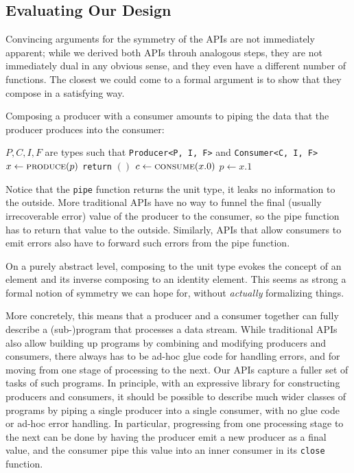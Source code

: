\documentclass[sigplan,screen,10pt,anonymous,review]{acmart}
\begin{document}
\subsection{Evaluating Our Design}\label{evaluating_ours}

Convincing arguments for the symmetry of the APIs are not immediately apparent; while we derived both APIs throuh analogous steps, they are not immediately dual in any obvious sense, and they even have a different number of functions. The closest we could come to a formal argument is to show that they compose in a satisfying way.

Composing a producer with a consumer amounts to piping the data that the producer produces into the consumer:

\begin{algorithmic}
\Require $P, C, I, F$ are types such that \texttt{Producer<P, I, F>} and \texttt{Consumer<C, I, F>}
    \Loop
        \State $x \gets \Call{produce}{p}$
            \State {}
            \State \texttt{return} $()$
        \Else
            \State $c \gets \Call{consume}{x.0}$
            \State $p \gets x.1$
        \EndIf
    \EndLoop
\EndProcedure
\end{algorithmic}

Notice that the \texttt{pipe} function returns the unit type, it leaks no information to the outside. More traditional APIs have no way to funnel the final (usually irrecoverable error) value of the producer to the consumer, so the pipe function has to return that value to the outside. Similarly, APIs that allow consumers to emit errors also have to forward such errors from the pipe function.

On a purely abstract level, composing to the unit type evokes the concept of an element and its inverse composing to an identity element. This seems as strong a formal notion of symmetry we can hope for, without \textit{actually} formalizing things.

More concretely, this means that a producer and a consumer together can fully describe a (sub-)program that processes a data stream. While traditional APIs also allow building up programs by combining and modifying producers and consumers, there always has to be ad-hoc glue code for handling errors, and for moving from one stage of processing to the next. Our APIs capture a fuller set of tasks of such programs. In principle, with an expressive library for constructing producers and consumers, it should be possible to describe much wider classes of programs by piping a single producer into a single consumer, with no glue code or ad-hoc error handling. In particular, progressing from one processing stage to the next can be done by having the producer emit a new producer as a final value, and the consumer pipe this value into an inner consumer in its \texttt{close} function.
\end{document}
